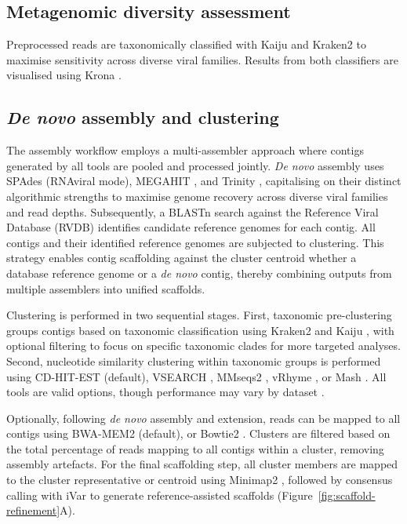 \subsection{Metagenomic diversity assessment}
Preprocessed reads are taxonomically classified with Kaiju \citep{Menzel2016-tz} and Kraken2 \citep{Wood2019-jl} to maximise sensitivity across diverse viral families. Results from both classifiers are visualised using Krona \citep{Ondov2011-yp}.

\subsection{\textit{De novo} assembly and clustering}
The assembly workflow employs a multi-assembler approach where contigs generated by all tools are pooled and processed jointly. \textit{De novo} assembly uses SPAdes \citep{Meleshko2021-gb} (RNAviral mode), MEGAHIT \citep{Li2016-sd}, and Trinity \citep{Grabherr2011-ef}, capitalising on their distinct algorithmic strengths to maximise genome recovery across diverse viral families and read depths. Subsequently, a BLASTn \citep{Altschul1990-sy} search against the Reference Viral Database (RVDB) \citep{Chin2025-fd} identifies candidate reference genomes for each contig. All contigs and their identified reference genomes are subjected to clustering. This strategy enables contig scaffolding against the cluster centroid whether a database reference genome or a \textit{de novo} contig, thereby combining outputs from multiple assemblers into unified scaffolds.

Clustering is performed in two sequential stages. First, taxonomic pre-clustering groups contigs based on taxonomic classification using Kraken2 \citep{Wood2019-jl} and Kaiju \citep{Menzel2016-tz}, with optional filtering to focus on specific taxonomic clades for more targeted analyses. Second, nucleotide similarity clustering within taxonomic groups is performed using CD-HIT-EST \citep{Li2006-nj} (default), VSEARCH \citep{Rognes2016-ju}, MMseqs2 \citep{Steinegger2017-ci}, vRhyme \citep{Kieft2022-km}, or Mash \citep{Ondov2019-bo}. All tools are valid options, though performance may vary by dataset \citep{Zielezinski2025-vl,Steinegger2017-ci}.

Optionally, following \textit{de novo} assembly and extension, reads can be mapped to all contigs using BWA-MEM2 \citep{Vasimuddin2019-rb} (default), or Bowtie2 \citep{Langmead2019-wx}. Clusters are filtered based on the total percentage of reads mapping to all contigs within a cluster, removing assembly artefacts. For the final scaffolding step, all cluster members are mapped to the cluster representative or centroid using Minimap2 \citep{Li2018-gi}, followed by consensus calling with iVar \citep{Grubaugh2019-xd} to generate reference-assisted scaffolds (Figure~\ref{fig:scaffold-refinement}A).

